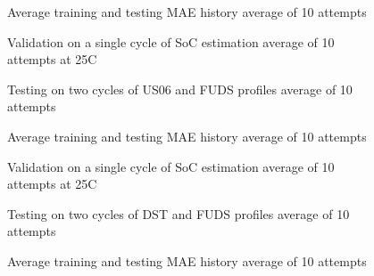 \begin{figure*}[htbp]
    \centering
    \begin{subfigure}[b]{0.325\textwidth}
        \centering
        
        \caption{Average training and testing MAE history average of 10 attempts}
    \end{subfigure}
    \hfill
    \begin{subfigure}[b]{0.325\textwidth}
        \centering
        
        \caption{Validation on a single cycle of SoC estimation average of 10 attempts at 25\textdegree{}C}
    \end{subfigure}
    \hfill
    \begin{subfigure}[b]{0.325\textwidth}
        \centering
        
        \caption{Testing on two cycles of US06 and FUDS profiles average of 10 attempts}
        \label{subfig:Model-3res-DSTvsFUDS}
    \end{subfigure}
    \begin{subfigure}[b]{0.325\textwidth}
        \centering
        
        \caption{Average training and testing MAE history average of 10 attempts}
    \end{subfigure}
    \hfill
    \begin{subfigure}[b]{0.325\textwidth}
        \centering
        
        \caption{Validation on a single cycle of SoC estimation average of 10 attempts at 25\textdegree{}C}
    \end{subfigure}
    \hfill
    \begin{subfigure}[b]{0.325\textwidth}
        \centering
        
        \caption{Testing on two cycles of DST and FUDS profiles average of 10 attempts}
    \end{subfigure}
    \begin{subfigure}[b]{0.325\textwidth}
        \centering
        
        \caption{Average training and testing MAE history average of 10 attempts}

\end{subfigure}
\end{figure*}
